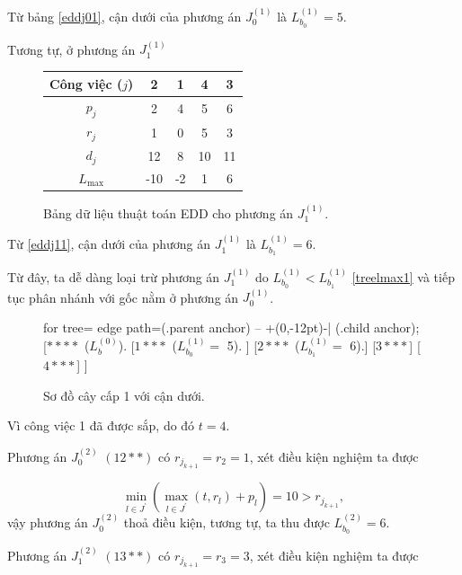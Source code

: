 \begin{vd}
Từ bảng \eqref{eddj01}, cận dưới của phương án $J_0^{(1)}$ là $L_{b_0}^{(1)} = 5$.

Tương tự, ở phương án $J_1^{(1)}$

\begin{figure}[h!]
	\centering
	\begin{tabular}{|c | c c c c |} 
	\hline
	Công việc ($j$) & 2 & 1 & 4 & 3 \\
	\hline\hline
	$p_j$ & 2 & 4 & 5 & 6 \\
	$r_j$ & 1 & 0 & 5 & 3 \\
	$d_j$ & 12 & 8 & 10 & 11 \\
	$L_{\max}$ & -10 & -2 & 1 & 6 \\ 
	\hline
	\end{tabular}
\caption{\label{eddj11} Bảng dữ liệu thuật toán EDD cho phương án $J_1^{(1)}$.}
\end{figure}

Từ \eqref{eddj11}, cận dưới của phương án $J_1^{(1)}$ là $L_{b_1}^{(1)} = 6$.

Từ đây, ta dễ dàng loại trừ phương án $J_1^{(1)}$ do $L_{b_0}^{(1)} < L_{b_1}^{(1)}$ \eqref{treelmax1} và tiếp tục phân nhánh với gốc nằm ở phương án $J_0^{(1)}$.

\begin{figure}[h!]
	\centering
	\begin{forest} for tree={
		edge path={\noexpand{} (.parent anchor) -- +(0,-12pt)-| (.child anchor);}
	}
	[{$****$ ($L_b^{(0)}$).}
		[{$1***$ ($L_{b_0}^{(1)} =$ 5).}
		]
		[{$2***$ ($L_{b_1}^{(1)} =$ 6).}]
		[$3***$]
		[$4***$]
	]
	\end{forest}
\caption{\label{treelmax1} Sơ đồ cây cấp 1 với cận dưới.}
\end{figure}


Vì công việc 1 đã được sắp, do đó $t=4$.

Phương án $J_0^{(2)}$ $(12**)$ có $r_{j_{k+1}} = r_2 = 1$, xét điều kiện nghiệm ta được

\begin{equation*}
\underset{l \in J^{'}}{\min} (\underset{l \in J^{'}}{\max} (t, r_l) + p_l) = 10 > r_{j_{k+1}},
\end{equation*}
vậy phương án $J_0^{(2)}$ thoả điều kiện, tương tự, ta thu được $L_{b_0}^{(2)} = 6$.

Phương án $J_1^{(2)}$ $(13**)$ có $r_{j_{k+1}} = r_3 = 3$, xét điều kiện nghiệm ta được


\end{vd}
